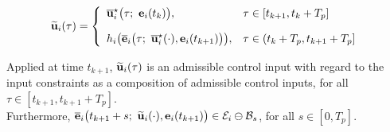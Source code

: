 \begin{equation}
  \widetilde{\vect{u}}_i(\tau) = \left\{
      \begin{array}{ll}
        \overline{\vect{u}}_i^{\star}\big(\tau;\ \vect{e}_i(t_k)\big), & \tau \in [t_{k+1}, t_k + T_p] \\[2.5ex]
        h_i\big(\overline{\vect{e}}_i\big(\tau;\ \overline{\vect{u}}_i^{\star}(\cdot), \vect{e}_i(t_{k+1})\big)\big), & \tau \in (t_k + T_p, t_{k+1} + T_p]
      \end{array}
      \right.
\label{eq:optimal_input_t_plus_one_with_disturbances}
\end{equation}

Applied at time $t_{k+1}$, $\widetilde{\bm{\mathbf{u}}}_i(\tau)$
is an admissible control input with regard to the input constraints as
a composition of admissible control inputs, for
all $\tau \in [t_{k+1}, t_{k+1} + T_p]$.\\[1ex]


Furthermore, $\overline{\vect{e}}_i\big(t_{k+1} + s;\ \widetilde{\vect{u}}_i(\cdot), \vect{e}_i(t_{k+1})\big) \in \mathcal{E}_i \ominus \mathcal{B}_{s}$,
for all $s \in [0, T_p]$.\\[1ex]


